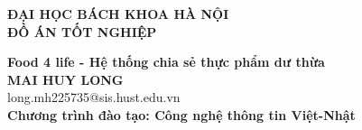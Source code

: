 \documentclass[main.tex]{subfiles}
\begin{document}
\begin{titlepage}
\thispagestyle{empty}
\begin{center}

{\textbf{\large{ĐẠI HỌC BÁCH KHOA HÀ NỘI}}}\\[4cm]

{\textbf{\huge{ ĐỒ ÁN TỐT NGHIỆP}}}\\[1cm]
{\textbf{\Large{Food 4 life - Hệ thống chia sẻ thực phẩm dư thừa}}\\[1cm]

{\textbf{\large{MAI HUY LONG}}}\\
{\large{long.mh225735@sis.hust.edu.vn}}\\[0.5cm]

{\textbf{\large{Chương trình đào tạo: Công nghệ thông tin Việt-Nhật
}}}\\

\vspace{4cm}
\begin{table}[H]
\centering
{}
\end{table}}
\end{center}



\end{titlepage}
\end{document}
